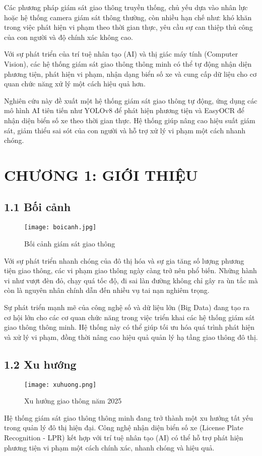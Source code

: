 \documentclass[conference]{IEEEtran}
\begin{document}
Các phương pháp giám sát giao thông truyền thống, chủ yếu dựa vào nhân lực hoặc hệ thống camera giám sát thông thường, còn nhiều hạn chế như: khó khăn trong việc phát hiện vi phạm theo thời gian thực, yêu cầu sự can thiệp thủ công của con người và độ chính xác không cao.

Với sự phát triển của trí tuệ nhân tạo (AI) và thị giác máy tính (Computer Vision), các hệ thống giám sát giao thông thông minh có thể tự động nhận diện phương tiện, phát hiện vi phạm, nhận dạng biển số xe và cung cấp dữ liệu cho cơ quan chức năng xử lý một cách hiệu quả hơn.

Nghiên cứu này đề xuất một hệ thống giám sát giao thông tự động, ứng dụng các mô hình AI tiên tiến như YOLOv8 để phát hiện phương tiện và EasyOCR để nhận diện biển số xe theo thời gian thực. Hệ thống giúp nâng cao hiệu suất giám sát, giảm thiểu sai sót của con người và hỗ trợ xử lý vi phạm một cách nhanh chóng.
\section{CHƯƠNG 1: GIỚI THIỆU}

\subsection{1.1 Bối cảnh}
\begin{figure}[H]
    \centering
    \texttt{[image: boicanh.jpg]} %
    \caption{Bối cảnh giám sát giao thông}
    \label{fig:traffic_monitoring}
\end{figure}
Với sự phát triển nhanh chóng của đô thị hóa và sự gia tăng số lượng phương tiện giao thông, các vi phạm giao thông ngày càng trở nên phổ biến. Những hành vi như vượt đèn đỏ, chạy quá tốc độ, đi sai làn đường không chỉ gây ra ùn tắc mà còn là nguyên nhân chính dẫn đến nhiều vụ tai nạn nghiêm trọng.

Sự phát triển mạnh mẽ của công nghệ số và dữ liệu lớn (Big Data) đang tạo ra cơ hội lớn cho các cơ quan chức năng trong việc triển khai các hệ thống giám sát giao thông thông minh. Hệ thống này có thể giúp tối ưu hóa quá trình phát hiện và xử lý vi phạm, đồng thời nâng cao hiệu quả quản lý hạ tầng giao thông đô thị.

\subsection{1.2 Xu hướng}
\begin{figure}[H]
    \centering
    \texttt{[image: xuhuong.png]} %
    \caption{Xu hướng giao thông năm 2025}
    \label{fig:traffic_monitoring}
\end{figure}
Hệ thống giám sát giao thông thông minh đang trở thành một xu hướng tất yếu trong quản lý đô thị hiện đại. Công nghệ nhận diện biển số xe (License Plate Recognition - LPR) kết hợp với trí tuệ nhân tạo (AI) có thể hỗ trợ phát hiện phương tiện vi phạm một cách chính xác, nhanh chóng và hiệu quả.
\end{document}

